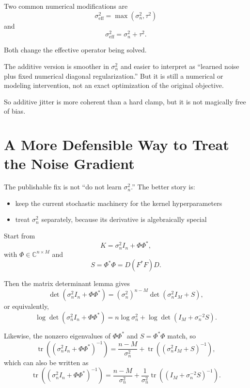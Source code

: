 \documentclass[11pt]{article}
\begin{document}
Two common numerical modifications are
\begin{equation}
\sigma_{\mathrm{eff}}^2
=
\max(\sigma_n^2, \tau^2)
\end{equation}
and
\begin{equation}
\sigma_{\mathrm{eff}}^2
=
\sigma_n^2 + \tau^2.
\end{equation}

Both change the effective operator being solved.

The additive version is smoother in $\sigma_n^2$ and easier to interpret as
``learned noise plus fixed numerical diagonal regularization.'' But it is still
a numerical or modeling intervention, not an exact optimization of the original
objective.

So additive jitter is more coherent than a hard clamp, but it is not magically
free of bias.

\section*{A More Defensible Way to Treat the Noise Gradient}

The publishable fix is not ``do not learn $\sigma_n^2$.'' The better story is:
\begin{itemize}
  \item keep the current stochastic machinery for the kernel hyperparameters
  \item treat $\sigma_n^2$ separately, because its derivative is algebraically
  special
\end{itemize}

Start from
\begin{equation}
K = \sigma_n^2 I_n + \Phi \Phi^\ast,
\end{equation}
with $\Phi \in \mathbb{C}^{n \times M}$ and
\begin{equation}
S = \Phi^\ast \Phi = D(F^\ast F)D.
\end{equation}

Then the matrix determinant lemma gives
\begin{equation}
\det(\sigma_n^2 I_n + \Phi \Phi^\ast)
=
(\sigma_n^2)^{n-M} \det(\sigma_n^2 I_M + S),
\end{equation}
or equivalently,
\begin{equation}
\log \det(\sigma_n^2 I_n + \Phi \Phi^\ast)
=
n \log \sigma_n^2
+
\log \det\!\left(I_M + \sigma_n^{-2} S\right).
\end{equation}

Likewise, the nonzero eigenvalues of $\Phi \Phi^\ast$ and $S = \Phi^\ast \Phi$
match, so
\begin{equation}
\operatorname{tr}\!\left((\sigma_n^2 I_n + \Phi \Phi^\ast)^{-1}\right)
=
\frac{n-M}{\sigma_n^2}
+
\operatorname{tr}\!\left((\sigma_n^2 I_M + S)^{-1}\right),
\end{equation}
which can also be written as
\begin{equation}
\operatorname{tr}\!\left((\sigma_n^2 I_n + \Phi \Phi^\ast)^{-1}\right)
=
\frac{n-M}{\sigma_n^2}
+
\frac{1}{\sigma_n^2}
\operatorname{tr}\!\left(\left(I_M + \sigma_n^{-2} S\right)^{-1}\right).
\end{equation}
\end{document}
